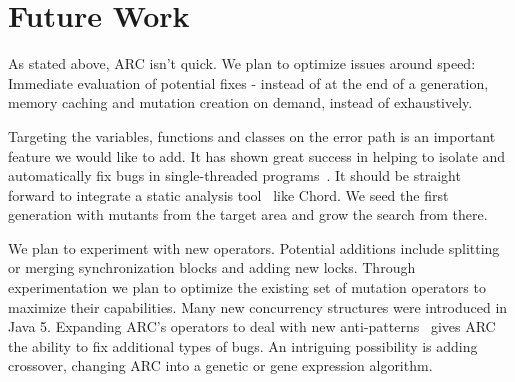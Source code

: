 \section{Future Work}
\label{sec:future_work}

As stated above, ARC isn't quick.  We plan to optimize issues around speed: Immediate evaluation of potential fixes - instead of at the end of a generation, memory caching and mutation creation on demand, instead of exhaustively.  

Targeting the variables, functions and classes on the error path is an important feature 
we would like to add. It has shown great success in helping to isolate
and automatically fix bugs in single-threaded programs~\cite{FNWG09, WNLF09,
NWLF09, WFGN10, GNFW11, LDFW12}. It should be straight forward to integrate a
static analysis tool~\cite{HP04, NPSG09, NWLF09} like Chord.  We seed the first generation with mutants from the target area and grow the search from there.

We plan to experiment with new operators. Potential additions include
splitting or merging synchronization blocks and adding new locks. Through
experimentation we plan to optimize the existing set of mutation operators to
maximize their capabilities.  Many new concurrency structures were introduced in Java 5. Expanding ARC's
operators to deal with new anti-patterns~\cite{BJ09, FKLV12, BCD06} gives ARC
the ability to fix additional types of bugs.  An intriguing possibility is adding crossover, changing ARC into a genetic or gene expression algorithm.




